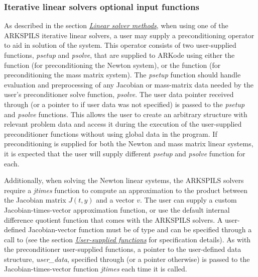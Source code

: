 \documentclass[letterpaper,10pt,english]{sphinxmanual}
\begin{document}
\subsubsection{Iterative linear solvers optional input functions}
\label{c_interface/User_callable:iterative-linear-solvers-optional-input-functions}\label{c_interface/User_callable:cinterface-arkspilsinputs}
As described in the section {\hyperref[Mathematics:mathematics-linear]{\emph{Linear solver methods}}}, when using one
of the ARKSPILS iterative linear solvers, a user may supply a
preconditioning operator to aid in solution of the system.  This
operator consists of two user-supplied functions, \emph{psetup} and
\emph{psolve}, that are supplied to ARKode using either the function
{\hyperref[c_interface/User_callable:ARKSpilsSetPreconditioner]{}} (for preconditioning the
Newton system), or the function
{\hyperref[c_interface/User_callable:ARKSpilsSetMassPreconditioner]{}} (for preconditioning the
mass matrix system).  The \emph{psetup} function should handle evaluation
and preprocessing of any Jacobian or mass-matrix data needed by the
user's preconditioner solve function, \emph{psolve}.  The user data pointer
received through {\hyperref[c_interface/User_callable:ARKodeSetUserData]{}} (or a pointer to
 if user data was not specified) is passed to the \emph{psetup} and
\emph{psolve} functions.  This allows the user to create an arbitrary
structure with relevant problem data and access it during the
execution of the user-supplied preconditioner functions without using
global data in the program.  If preconditioning is supplied for both
the Newton and mass matrix linear systems, it is expected that the
user will supply different \emph{psetup} and \emph{psolve} function for each.

Additionally, when solving the Newton linear systems, the ARKSPILS
solvers require a \emph{jtimes} function to compute an approximation to the
product between the Jacobian matrix $J(t,y)$ and a vector
$v$. The user can supply a custom Jacobian-times-vector
approximation function, or use the default internal difference
quotient function that comes with the ARKSPILS solvers.  A
user-defined Jacobian-vector function must be of type
{\hyperref[c_interface/User_supplied:ARKSpilsJacTimesVecFn]{}} and can be specified through a call
to {\hyperref[c_interface/User_callable:ARKSpilsSetJacTimesVecFn]{}} (see the section
{\hyperref[c_interface/User_supplied:cinterface-usersupplied]{\emph{User-supplied functions}}} for specification details).  As with the
preconditioner user-supplied functions, a pointer to the user-defined
data structure, \emph{user\_data}, specified through
{\hyperref[c_interface/User_callable:ARKodeSetUserData]{}} (or a  pointer otherwise) is
passed to the Jacobian-times-vector function \emph{jtimes} each time it
is called.
\end{document}

